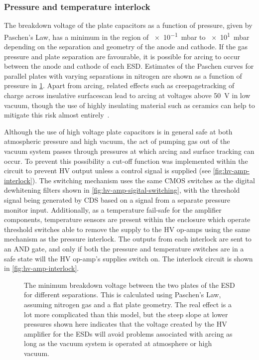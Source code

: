 \subsubsection{Pressure and temperature interlock}
The breakdown voltage of the plate capacitors as a function of pressure, given by Paschen's Law, has a minimum in the region of \SI{e-1}{\milli\bar} to \SI{e1}{\milli\bar} depending on the separation and geometry of the anode and cathode. If the gas pressure and plate separation are favourable, it is possible for arcing to occur between the anode and cathode of each \gls{ESD}. Estimates of the Paschen curves for parallel plates with varying separations in nitrogen are shown as a function of pressure in \cref{fig:esd-paschen}. Apart from arcing, related effects such as creepage\textemdash tracking of charge across insulative surfaces\textemdash can lead to arcing at voltages above \SI{50}{\volt} in low vacuum, though the use of highly insulating material such as ceramics can help to mitigate this risk almost entirely~\cite{EN2010}.

Although the use of high voltage plate capacitors is in general safe at both atmospheric pressure and high vacuum, the act of pumping gas out of the vacuum system passes through pressures at which arcing and surface tracking can occur. To prevent this possibility a cut-off function was implemented within the circuit to prevent \gls{HV} output unless a control signal is supplied (see \cref{fig:hv-amp-interlock}). The switching mechanism uses the same \gls{CMOS} switches as the digital dewhitening filters shown in \cref{fig:hv-amp-sigital-switching}, with the threshold signal being generated by \gls{CDS} based on a signal from a separate pressure monitor input. Additionally, as a temperature fail-safe for the amplifier components, temperature sensors are present within the enclosure which operate threshold switches able to remove the supply to the \gls{HV} op-amps using the same mechanism as the pressure interlock. The outputs from each interlock are sent to an AND gate, and only if both the pressure and temperature switches are in a safe state will the \gls{HV} op-amp's supplies switch on. The interlock circuit is shown in \cref{fig:hv-amp-interlock}.

\begin{figure}[htp]
  \centering
  
  \caption[Minimum breakdown voltage between the two plates of the electrostatic drive for different separations]{\label{fig:esd-paschen}The minimum breakdown voltage between the two plates of the \gls{ESD} for different separations. This is calculated using Paschen's Law, assuming nitrogen gas and a flat plate geometry. The real effect is a lot more complicated than this model, but the steep slope at lower pressures shown here indicates that the voltage created by the \gls{HV} amplifier for the \glspl{ESD} will avoid problems associated with arcing as long as the vacuum system is operated at atmosphere or high vacuum.}
\end{figure}

